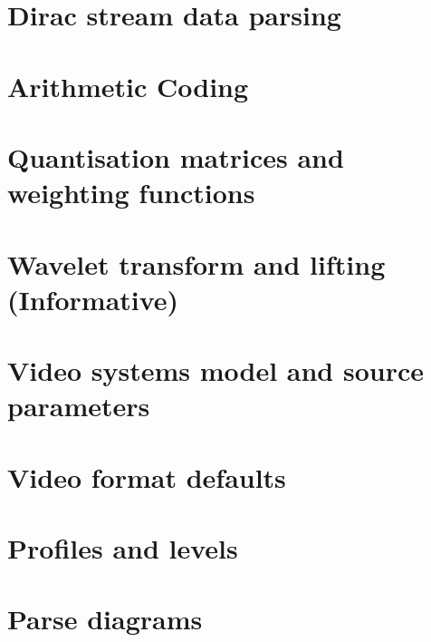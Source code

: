 




\appendix
\section{Dirac stream data parsing}

\clearpage
\section{Arithmetic Coding}

\clearpage
\section{Quantisation matrices and weighting functions}


\clearpage
\section{Wavelet transform and lifting (Informative)}


\clearpage
\section{Video systems model and source parameters}


\clearpage
\section{Video format defaults}

\clearpage
\section{Profiles and levels}

\clearpage
\section{Parse diagrams}


